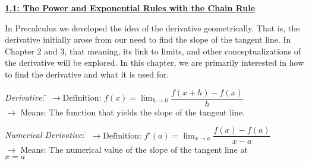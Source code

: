 \textbf{\underline{\large{1.1: The Power and Exponential Rules with the Chain Rule}}} \par

In Precalculus we developed the idea of the derivative geometrically. That is, the derivative initially arose from our need to find the slope of the tangent line. In Chapter 2 and 3, that meaning, its link to limits, and other conceptualizations of the derivative will be explored. In this chapter, we are primarily interested in how to find the derivative and what it is used for. \par

\begin{tabbing}
    \textit{Derivative}: \= $\rightarrow \text{Definition: } f(x) = \lim_{h \to 0} \dfrac{f(x + h) - f(x)}{h}$ \\[5.5pt]
    \> $\rightarrow$ {Means:  The function that yields the slope of the tangent line.}
\end{tabbing}
\begin{tabbing}
    \textit{Numerical Derivative}: \= $\rightarrow \text{Definition: } f'(a) = \lim_{x \to a} \dfrac{f(x) - f(a)}{x - a}$ \\[5.5pt]
    \> $\rightarrow$ Means: \= The numerical value of the slope of the tangent line at \\
    \> \> $x = a$ 
\end{tabbing}



